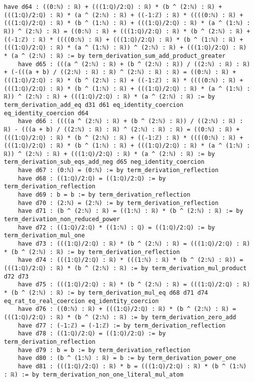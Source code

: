 \documentclass{article}
\begin{document}
\begin{tcolorbox}[colback=white!10, width=\linewidth]
\begin{lstlisting}[language=Lean4]
    have d64 : ((0:ℕ) : ℝ) + (((1:ℚ)/2:ℚ) : ℝ) * (b ^ (2:ℕ) : ℝ) + (((1:ℚ)/2:ℚ) : ℝ) * (a ^ (2:ℕ) : ℝ) + ((-1:ℤ) : ℝ) * ((((0:ℕ) : ℝ) + (((1:ℚ)/2:ℚ) : ℝ) * (b ^ (1:ℕ) : ℝ) + (((1:ℚ)/2:ℚ) : ℝ) * (a ^ (1:ℕ) : ℝ)) ^ (2:ℕ) : ℝ) = ((0:ℕ) : ℝ) + (((1:ℚ)/2:ℚ) : ℝ) * (b ^ (2:ℕ) : ℝ) + ((-1:ℤ) : ℝ) * ((((0:ℕ) : ℝ) + (((1:ℚ)/2:ℚ) : ℝ) * (b ^ (1:ℕ) : ℝ) + (((1:ℚ)/2:ℚ) : ℝ) * (a ^ (1:ℕ) : ℝ)) ^ (2:ℕ) : ℝ) + (((1:ℚ)/2:ℚ) : ℝ) * (a ^ (2:ℕ) : ℝ) := by term_derivation_sum_add_product_greater
    have d65 : (((a ^ (2:ℕ) : ℝ) + (b ^ (2:ℕ) : ℝ)) / ((2:ℕ) : ℝ) : ℝ) + (-(((a + b) / ((2:ℕ) : ℝ) : ℝ) ^ (2:ℕ) : ℝ) : ℝ) = ((0:ℕ) : ℝ) + (((1:ℚ)/2:ℚ) : ℝ) * (b ^ (2:ℕ) : ℝ) + ((-1:ℤ) : ℝ) * ((((0:ℕ) : ℝ) + (((1:ℚ)/2:ℚ) : ℝ) * (b ^ (1:ℕ) : ℝ) + (((1:ℚ)/2:ℚ) : ℝ) * (a ^ (1:ℕ) : ℝ)) ^ (2:ℕ) : ℝ) + (((1:ℚ)/2:ℚ) : ℝ) * (a ^ (2:ℕ) : ℝ) := by term_derivation_add_eq d31 d61 eq_identity_coercion eq_identity_coercion d64
    have d66 : ((((a ^ (2:ℕ) : ℝ) + (b ^ (2:ℕ) : ℝ)) / ((2:ℕ) : ℝ) : ℝ) - (((a + b) / ((2:ℕ) : ℝ) : ℝ) ^ (2:ℕ) : ℝ) : ℝ) = ((0:ℕ) : ℝ) + (((1:ℚ)/2:ℚ) : ℝ) * (b ^ (2:ℕ) : ℝ) + ((-1:ℤ) : ℝ) * ((((0:ℕ) : ℝ) + (((1:ℚ)/2:ℚ) : ℝ) * (b ^ (1:ℕ) : ℝ) + (((1:ℚ)/2:ℚ) : ℝ) * (a ^ (1:ℕ) : ℝ)) ^ (2:ℕ) : ℝ) + (((1:ℚ)/2:ℚ) : ℝ) * (a ^ (2:ℕ) : ℝ) := by term_derivation_sub_eqs_add_neg d65 neg_identity_coercion
    have d67 : (0:ℕ) = (0:ℕ) := by term_derivation_reflection
    have d68 : ((1:ℚ)/2:ℚ) = ((1:ℚ)/2:ℚ) := by term_derivation_reflection
    have d69 : b = b := by term_derivation_reflection
    have d70 : (2:ℕ) = (2:ℕ) := by term_derivation_reflection
    have d71 : (b ^ (2:ℕ) : ℝ) = ((1:ℕ) : ℝ) * (b ^ (2:ℕ) : ℝ) := by term_derivation_non_reduced_power
    have d72 : ((1:ℚ)/2:ℚ) * ((1:ℕ) : ℚ) = ((1:ℚ)/2:ℚ) := by term_derivation_mul_one
    have d73 : (((1:ℚ)/2:ℚ) : ℝ) * (b ^ (2:ℕ) : ℝ) = (((1:ℚ)/2:ℚ) : ℝ) * (b ^ (2:ℕ) : ℝ) := by term_derivation_reflection
    have d74 : (((1:ℚ)/2:ℚ) : ℝ) * (((1:ℕ) : ℝ) * (b ^ (2:ℕ) : ℝ)) = (((1:ℚ)/2:ℚ) : ℝ) * (b ^ (2:ℕ) : ℝ) := by term_derivation_mul_product d72 d73
    have d75 : (((1:ℚ)/2:ℚ) : ℝ) * (b ^ (2:ℕ) : ℝ) = (((1:ℚ)/2:ℚ) : ℝ) * (b ^ (2:ℕ) : ℝ) := by term_derivation_mul_eq d68 d71 d74 eq_rat_to_real_coercion eq_identity_coercion
    have d76 : ((0:ℕ) : ℝ) + (((1:ℚ)/2:ℚ) : ℝ) * (b ^ (2:ℕ) : ℝ) = (((1:ℚ)/2:ℚ) : ℝ) * (b ^ (2:ℕ) : ℝ) := by term_derivation_zero_add
    have d77 : (-1:ℤ) = (-1:ℤ) := by term_derivation_reflection
    have d78 : ((1:ℚ)/2:ℚ) = ((1:ℚ)/2:ℚ) := by term_derivation_reflection
    have d79 : b = b := by term_derivation_reflection
    have d80 : (b ^ (1:ℕ) : ℝ) = b := by term_derivation_power_one
    have d81 : (((1:ℚ)/2:ℚ) : ℝ) * b = (((1:ℚ)/2:ℚ) : ℝ) * (b ^ (1:ℕ) : ℝ) := by term_derivation_non_one_literal_mul_atom

\end{lstlisting}
\end{tcolorbox}
\end{document}

